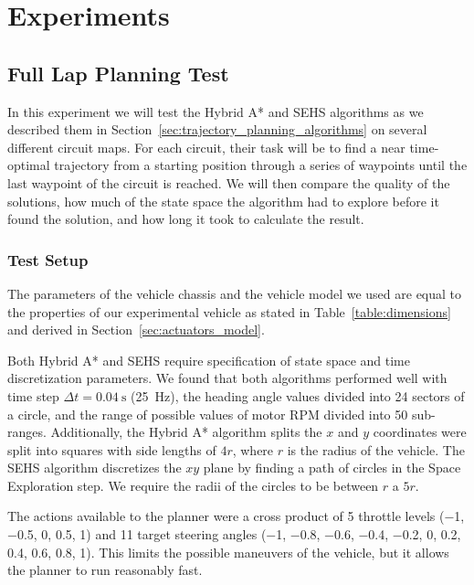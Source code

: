\chapter{Experiments}
\label{chapter:experiments}


\section{Full Lap Planning Test}

In this experiment we will test the Hybrid A* and \gls{SEHS} algorithms as we described them in Section~\ref{sec:trajectory_planning_algorithms} on several different circuit maps. For each circuit, their task will be to find a near time-optimal trajectory from a starting position through a series of waypoints until the last waypoint of the circuit is reached. We will then compare the quality of the solutions, how much of the state space the algorithm had to explore before it found the solution, and how long it took to calculate the result.

\subsection{Test Setup}

The parameters of the vehicle chassis and the vehicle model we used are equal to the properties of our experimental vehicle as stated in Table~\ref{table:dimensions} and derived in Section~\ref{sec:actuators_model}.

Both Hybrid A* and \gls*{SEHS} require specification of state space and time discretization parameters. We found that both algorithms performed well with time step $\Delta t=\SI{0.04}{\second}$ (\SI{25}{\hertz}), the heading angle values divided into \num{24} sectors of a circle, and the range of possible values of motor \gls*{RPM} divided into \num{50} sub-ranges. Additionally, the Hybrid A* algorithm splits the $x$ and $y$ coordinates were split into squares with side lengths of $4r$, where $r$ is the radius of the vehicle. The SEHS algorithm discretizes the $xy$ plane by finding a path of circles in the Space Exploration step. We require the radii of the circles to be between $r$ a $5r$.

The actions available to the planner were a cross product of 5 throttle levels (\num{-1}, \num{-0.5}, \num{0}, \num{0.5}, \num{1}) and 11 target steering angles (\num{-1}, \num{-0.8}, \num{-0.6}, \num{-0.4}, \num{-0.2}, \num{0}, \num{0.2}, \num{0.4}, \num{0.6}, \num{0.8}, \num{1}). This limits the possible maneuvers of the vehicle, but it allows the planner to run reasonably fast.

